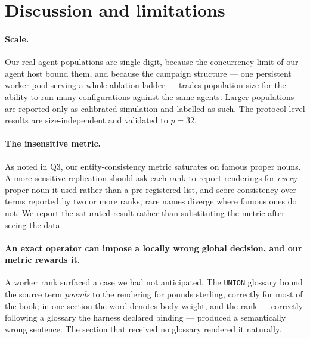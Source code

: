 \documentclass[10pt,twocolumn]{article}
\theoremstyle{definition}
\theoremstyle{plain}
\newcommand{\code}[1]{\texttt{\small #1}}
\begin{document}
\begin{table}[t]
\centering\scriptsize

\caption{Algorithm recommendations under three objectives. Where the time-optimal
and fidelity-optimal choices differ, the harness author has a decision to make that
MPI never presents.}
\label{tab:crossovers}
\end{table}

\section{Discussion and limitations}
\label{sec:limitations}

\paragraph{Scale.} Our real-agent populations are single-digit, because the
concurrency limit of our agent host bound them, and because the campaign structure
--- one persistent worker pool serving a whole ablation ladder --- trades population
size for the ability to run many configurations against the same agents. Larger
populations are reported only as calibrated simulation and labelled as such. The
protocol-level results are size-independent and validated to $p=32$.

\paragraph{The insensitive metric.} As noted in Q3, our entity-consistency metric
saturates on famous proper nouns. A more sensitive replication should ask each rank
to report renderings for \emph{every} proper noun it used rather than a
pre-registered list, and score consistency over terms reported by two or more
ranks; rare names diverge where famous ones do not. We report the saturated result
rather than substituting the metric after seeing the data.

\paragraph{An exact operator can impose a locally wrong global decision, and our
metric rewards it.} A worker rank surfaced a case we had not anticipated. The
\code{UNION} glossary bound the source term \emph{pounds} to the rendering for pounds
sterling, correctly for most of the book; in one section the word denotes body weight,
and the rank --- correctly following a glossary the harness declared binding ---
produced a semantically wrong sentence. The section that received no glossary rendered
it naturally.
\end{document}
